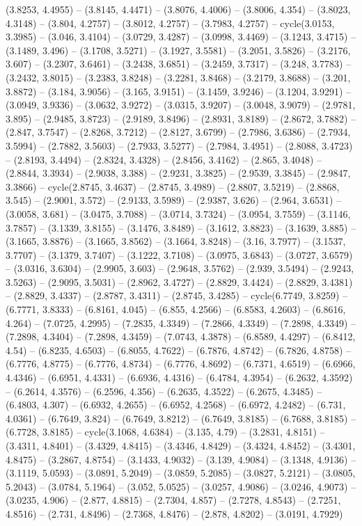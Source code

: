 (3.8253, 4.4955) -- (3.8145, 4.4471) -- (3.8076, 4.4006) -- (3.8006, 4.354) -- (3.8023, 4.3148) -- (3.804, 4.2757) -- (3.8012, 4.2757) -- (3.7983, 4.2757) -- cycle(3.0153, 3.3985) -- (3.046, 3.4104) -- (3.0729, 3.4287) -- (3.0998, 3.4469) -- (3.1243, 3.4715) -- (3.1489, 3.496) -- (3.1708, 3.5271) -- (3.1927, 3.5581) -- (3.2051, 3.5826) -- (3.2176, 3.607) -- (3.2307, 3.6461) -- (3.2438, 3.6851) -- (3.2459, 3.7317) -- (3.248, 3.7783) -- (3.2432, 3.8015) -- (3.2383, 3.8248) -- (3.2281, 3.8468) -- (3.2179, 3.8688) -- (3.201, 3.8872) -- (3.184, 3.9056) -- (3.165, 3.9151) -- (3.1459, 3.9246) -- (3.1204, 3.9291) -- (3.0949, 3.9336) -- (3.0632, 3.9272) -- (3.0315, 3.9207) -- (3.0048, 3.9079) -- (2.9781, 3.895) -- (2.9485, 3.8723) -- (2.9189, 3.8496) -- (2.8931, 3.8189) -- (2.8672, 3.7882) -- (2.847, 3.7547) -- (2.8268, 3.7212) -- (2.8127, 3.6799) -- (2.7986, 3.6386) -- (2.7934, 3.5994) -- (2.7882, 3.5603) -- (2.7933, 3.5277) -- (2.7984, 3.4951) -- (2.8088, 3.4723) -- (2.8193, 3.4494) -- (2.8324, 3.4328) -- (2.8456, 3.4162) -- (2.865, 3.4048) -- (2.8844, 3.3934) -- (2.9038, 3.388) -- (2.9231, 3.3825) -- (2.9539, 3.3845) -- (2.9847, 3.3866) -- cycle(2.8745, 3.4637) -- (2.8745, 3.4989) -- (2.8807, 3.5219) -- (2.8868, 3.545) -- (2.9001, 3.572) -- (2.9133, 3.5989) -- (2.9387, 3.626) -- (2.964, 3.6531) -- (3.0058, 3.681) -- (3.0475, 3.7088) -- (3.0714, 3.7324) -- (3.0954, 3.7559) -- (3.1146, 3.7857) -- (3.1339, 3.8155) -- (3.1476, 3.8489) -- (3.1612, 3.8823) -- (3.1639, 3.885) -- (3.1665, 3.8876) -- (3.1665, 3.8562) -- (3.1664, 3.8248) -- (3.16, 3.7977) -- (3.1537, 3.7707) -- (3.1379, 3.7407) -- (3.1222, 3.7108) -- (3.0975, 3.6843) -- (3.0727, 3.6579) -- (3.0316, 3.6304) -- (2.9905, 3.603) -- (2.9648, 3.5762) -- (2.939, 3.5494) -- (2.9243, 3.5263) -- (2.9095, 3.5031) -- (2.8962, 3.4727) -- (2.8829, 3.4424) -- (2.8829, 3.4381) -- (2.8829, 3.4337) -- (2.8787, 3.4311) -- (2.8745, 3.4285) -- cycle(6.7749, 3.8259) -- (6.7771, 3.8333) -- (6.8161, 4.045) -- (6.855, 4.2566) -- (6.8583, 4.2603) -- (6.8616, 4.264) -- (7.0725, 4.2995) -- (7.2835, 4.3349) -- (7.2866, 4.3349) -- (7.2898, 4.3349) -- (7.2898, 4.3404) -- (7.2898, 4.3459) -- (7.0743, 4.3878) -- (6.8589, 4.4297) -- (6.8412, 4.54) -- (6.8235, 4.6503) -- (6.8055, 4.7622) -- (6.7876, 4.8742) -- (6.7826, 4.8758) -- (6.7776, 4.8775) -- (6.7776, 4.8734) -- (6.7776, 4.8692) -- (6.7371, 4.6519) -- (6.6966, 4.4346) -- (6.6951, 4.4331) -- (6.6936, 4.4316) -- (6.4784, 4.3954) -- (6.2632, 4.3592) -- (6.2614, 4.3576) -- (6.2596, 4.356) -- (6.2635, 4.3522) -- (6.2675, 4.3485) -- (6.4803, 4.307) -- (6.6932, 4.2655) -- (6.6952, 4.2568) -- (6.6972, 4.2482) -- (6.731, 4.0361) -- (6.7649, 3.824) -- (6.7649, 3.8212) -- (6.7649, 3.8185) -- (6.7688, 3.8185) -- (6.7728, 3.8185) -- cycle(3.1068, 4.6384) -- (3.135, 4.79) -- (3.2831, 4.8151) -- (3.4311, 4.8401) -- (3.4329, 4.8415) -- (3.4346, 4.8429) -- (3.4324, 4.8452) -- (3.4301, 4.8475) -- (3.2867, 4.8754) -- (3.1433, 4.9032) -- (3.139, 4.9084) -- (3.1348, 4.9136) -- (3.1119, 5.0593) -- (3.0891, 5.2049) -- (3.0859, 5.2085) -- (3.0827, 5.2121) -- (3.0805, 5.2043) -- (3.0784, 5.1964) -- (3.052, 5.0525) -- (3.0257, 4.9086) -- (3.0246, 4.9073) -- (3.0235, 4.906) -- (2.877, 4.8815) -- (2.7304, 4.857) -- (2.7278, 4.8543) -- (2.7251, 4.8516) -- (2.731, 4.8496) -- (2.7368, 4.8476) -- (2.878, 4.8202) -- (3.0191, 4.7929) 